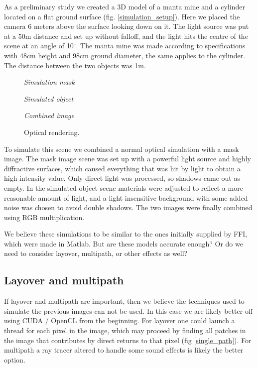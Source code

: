 \documentclass[
   article                                      %
 , 12pt                                         %
 , xelatex                                      %
 , bibtex                                       %
 , layout
]{common/mytemplate}
\begin{document}
As a preliminary study we created a 3D model of a manta mine and a cylinder located on a flat ground surface (fig. \ref{simulation_setup}). Here we placed the camera 6 meters above the surface looking down on it. The light source was put at a 50\;m distance and set up without falloff, and the light hits the centre of the scene at an angle of 10$^\circ$. The manta mine was made according to specifications with 48\;cm height and 98\;cm ground diameter, the same applies to the cylinder. The distance between the two objects was 1\;m.

\begin{figure}[b]
\begin{minipage}[c]{0.49\linewidth}
\centering\itshape Simulation mask
\end{minipage}\mbox{}\hfill
\begin{minipage}[c]{0.49\linewidth}
\centering\itshape Simulated object
\end{minipage}
\centering\itshape Combined image\vspace{5pt}
\caption{Optical rendering.}\label{s}
\end{figure}

To simulate this scene we combined a normal optical simulation with a mask image. The mask image scene was set up with a powerful light source and highly diffractive surfaces, which caused everything that was hit by light to obtain a high intensity value. Only direct light was processed, so shadows came out as empty. In the simulated object scene materials were adjusted to reflect a more reasonable amount of light, and a light insensitive background with some added noise was chosen to avoid double shadows. The two images were finally combined using RGB multiplication.

We believe these simulations to be similar to the ones initially supplied by FFI, which were made in Matlab. But are these models accurate enough? Or do we need to consider layover, multipath, or other effects as well?


\subsection{Layover and multipath}

If layover and multipath are important, then we believe the techniques used to simulate the previous images can not be used. In this case we are likely better off using CUDA / OpenCL from the beginning. For layover one could launch a thread for each pixel in the image, which may proceed by finding all patches in the image that contributes by direct returns to that pixel (fig \ref{single_path}). For multipath a ray tracer altered to handle some sound effects is likely the better option.
\end{document}
